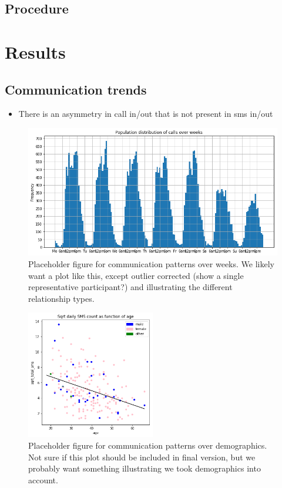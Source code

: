 \documentclass{article}
\begin{document}
\subsection{Procedure}

\section{Results}

\subsection{Communication trends}
\begin{itemize}
    \item There is an asymmetry in call in/out that is not present in sms in/out
\end{itemize}
\begin{figure}[H]
    \centering
    \includegraphics[width=\textwidth]{figures/call_trend.png}
    \caption{Placeholder figure for communication patterns over weeks. We likely want a plot like this, except outlier corrected (show a single representative participant?) and illustrating the different relationship types.}
\end{figure}

\begin{figure}[H]
    \centering
    \includegraphics[width=0.5\textwidth]{figures/sms_age_scatter.png}
    \caption{Placeholder figure for communication patterns over demographics. Not sure if this plot should be included in final version, but we probably want something illustrating we took demographics into account.}
\end{figure}
\end{document}

